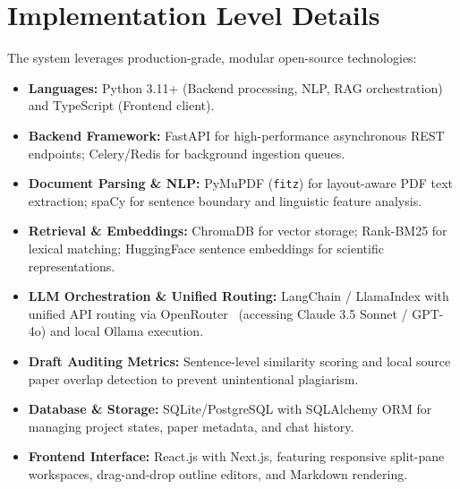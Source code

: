 \documentclass[10pt,a4paper]{article}
\begin{document}
\section{Implementation Level Details}
The system leverages production-grade, modular open-source technologies:
\begin{itemize}
    \item \textbf{Languages:} Python 3.11+ (Backend processing, NLP, RAG orchestration) and TypeScript (Frontend client).
    \item \textbf{Backend Framework:} FastAPI for high-performance asynchronous REST endpoints; Celery/Redis for background ingestion queues.
    \item \textbf{Document Parsing \& NLP:} PyMuPDF (\texttt{fitz}) for layout-aware PDF text extraction; spaCy for sentence boundary and linguistic feature analysis.
    \item \textbf{Retrieval \& Embeddings:} ChromaDB for vector storage; Rank-BM25 for lexical matching; HuggingFace sentence embeddings for scientific representations.
    \item \textbf{LLM Orchestration \& Unified Routing:} LangChain / LlamaIndex with unified API routing via OpenRouter~\cite{OpenRouter2026docs} (accessing Claude 3.5 Sonnet / GPT-4o) and local Ollama execution.
    \item \textbf{Draft Auditing Metrics:} Sentence-level similarity scoring and local source paper overlap detection to prevent unintentional plagiarism.
    \item \textbf{Database \& Storage:} SQLite/PostgreSQL with SQLAlchemy ORM for managing project states, paper metadata, and chat history.
    \item \textbf{Frontend Interface:} React.js with Next.js, featuring responsive split-pane workspaces, drag-and-drop outline editors, and Markdown rendering.
\end{itemize}

\end{document}
